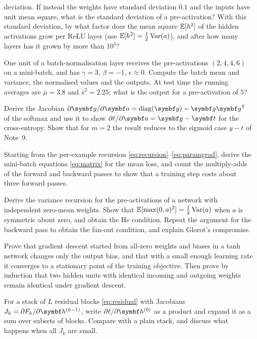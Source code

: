 \documentclass[11pt]{article}
\newcommand{\av}{\vect{a}}
\newcommand{\hv}{\vect{h}}
\newcommand{\yv}{\vect{y}}
\newcommand{\tvec}{\vect{t}}
\newcommand{\diag}{\operatorname{diag}}
\begin{document}
\begin{questions}
\begin{calculations}
  deviation. If instead the weights have standard deviation $0.1$ and the inputs have unit mean square, what is the
  standard deviation of a pre-activation? With this standard deviation, by what factor does the mean square $\mathbb{E}[h^2]$
  of the hidden activations grow per ReLU layer (use $\mathbb{E}[h^2] = \frac12\operatorname{Var}(a)$), and after how many layers has it grown
  by more than $10^3$?
\item One unit of a batch-normalisation layer receives the pre-activations $(2, 4, 4, 6)$ on a mini-batch, and has $\gamma
  = 3$, $\beta = -1$, $\epsilon \approx 0$. Compute the batch mean and variance, the normalised values and the outputs.
  At test time the running averages are $\bar{\mu} = 3.8$ and $\bar{s}^2 = 2.25$; what is the output for a pre-activation of $5$?
\end{calculations}

\begin{derivations}
\item Derive the Jacobian $\partial\yv/\partial\av = \diag(\yv) - \yv\yv\T$ of the softmax and use it to show
  $\partial\ell/\partial\av = \yv - \tvec$ for the cross-entropy. Show that for $m = 2$ the result reduces to the
  sigmoid case $y - t$ of Note~9.
\item Starting from the per-example recursion \eqref{eq:recursion}--\eqref{eq:paramgrad}, derive the mini-batch
  equations \eqref{eq:matrix} for the mean loss, and count the multiply-adds of the forward and backward passes to show
  that a training step costs about three forward passes.
\item Derive the variance recursion for the pre-activations of a network with independent zero-mean weights. Show that
  $\mathbb{E}[\max(0, a)^2] = \frac12\operatorname{Var}(a)$ when $a$ is symmetric about zero, and obtain the He condition. Repeat the argument
  for the backward pass to obtain the fan-out condition, and explain Glorot's compromise.
\item Prove that gradient descent started from all-zero weights and biases in a tanh network changes only the output
  bias, and that with a small enough learning rate it converges to a stationary point of the training objective. Then prove by induction that two hidden units with identical incoming and outgoing
  weights remain identical under gradient descent.
\item For a stack of $L$ residual blocks \eqref{eq:residual} with Jacobians $J_k = \partial F_k/\partial\hv^{(k-1)}$, write
  $\partial\ell/\partial\hv^{(0)}$ as a product and expand it as a sum over subsets of blocks. Compare with a plain stack,
  and discuss what happens when all $J_k$ are small.
\end{derivations}


\end{questions}
\end{document}
